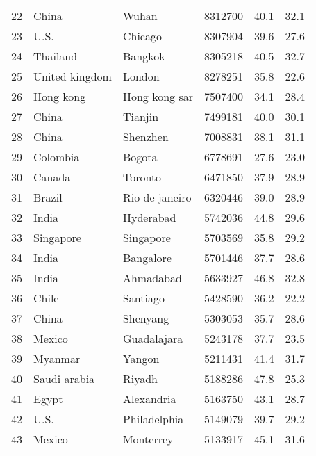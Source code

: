 \begin{center}
\begin{longtable}{clllcc}
  22 &               China &           Wuhan &    8312700 &     40.1 &     32.1 \\
  23 &                U.S. &         Chicago &    8307904 &     39.6 &     27.6 \\
  24 &            Thailand &         Bangkok &    8305218 &     40.5 &     32.7 \\
  25 &      United kingdom &          London &    8278251 &     35.8 &     22.6 \\
  26 &           Hong kong &   Hong kong sar &    7507400 &     34.1 &     28.4 \\
  27 &               China &         Tianjin &    7499181 &     40.0 &     30.1 \\
  28 &               China &        Shenzhen &    7008831 &     38.1 &     31.1 \\
  29 &            Colombia &          Bogota &    6778691 &     27.6 &     23.0 \\
  30 &              Canada &         Toronto &    6471850 &     37.9 &     28.9 \\
  31 &              Brazil &  Rio de janeiro &    6320446 &     39.0 &     28.9 \\
  32 &               India &       Hyderabad &    5742036 &     44.8 &     29.6 \\
  33 &           Singapore &       Singapore &    5703569 &     35.8 &     29.2 \\
  34 &               India &       Bangalore &    5701446 &     37.7 &     28.6 \\
  35 &               India &       Ahmadabad &    5633927 &     46.8 &     32.8 \\
  36 &               Chile &        Santiago &    5428590 &     36.2 &     22.2 \\
  37 &               China &        Shenyang &    5303053 &     35.7 &     28.6 \\
  38 &              Mexico &     Guadalajara &    5243178 &     37.7 &     23.5 \\
  39 &             Myanmar &          Yangon &    5211431 &     41.4 &     31.7 \\
  40 &        Saudi arabia &          Riyadh &    5188286 &     47.8 &     25.3 \\
  41 &               Egypt &      Alexandria &    5163750 &     43.1 &     28.7 \\
  42 &                U.S. &    Philadelphia &    5149079 &     39.7 &     29.2 \\
  43 &              Mexico &       Monterrey &    5133917 &     45.1 &     31.6 \\

\end{longtable}
\end{center}
